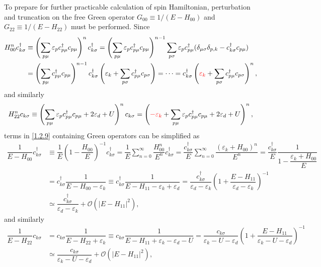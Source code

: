 \documentclass[aps,prx,superscriptaddress,onecolumn,preprintnumbers,nofootinbib,longbibliography]{revtex4-1}
\begin{document}
		\indent To prepare for further practicable calculation of spin Hamiltonian, perturbation and truncation on the free Green operator $G_{00}\equiv1/(E-H_{00})$ and $G_{22}\equiv1/(E-H_{22})$ must be performed. Since
		\begin{align*}
			H_{00}^nc_{k \sigma}^\dagger&\equiv\left(\sum_{p\mu}\varepsilon_p c_{p \mu}^\dagger c_{p\mu}\right)^n c_{k \sigma}^\dagger=\left(\sum_{p\mu}\varepsilon_p c_{p \mu}^\dagger c_{p\mu}\right)^{n-1}\sum_{p \sigma}\varepsilon_p c_{p\mu}^\dagger(\delta_{\mu\sigma}\delta_{p,k}-c_{k \sigma}^\dagger c_{p\mu})\\
			&=\left(\sum_{p\mu}c_{p \mu}^\dagger c_{p\mu}\right)^{n-1}c_{k\sigma}^\dagger\left(\varepsilon_k+\sum_{p \sigma}c_{p\mu}^\dagger c_{p\sigma}\right)=\cdots=c_{k\sigma}^\dagger\left({\color{red}\varepsilon_k}+\sum_{p \sigma}c_{p\mu}^\dagger c_{p\sigma}\right)^n,
		\end{align*}
		and similarly
		\begin{equation*}
			H_{22}^n c_{k \sigma}\equiv\left(\sum_{p\mu}\varepsilon_p c_{p\mu}^\dagger c_{p\mu}+2\varepsilon_d+U\right)^nc_{k\sigma}=\left({\color{red}-\varepsilon_k}+\sum_{p\mu}\varepsilon_p c_{p\mu}^\dagger c_{p\mu}+2 \varepsilon_d+U\right)^n,
		\end{equation*}
		terms in \eqref{1.2.9} containing Green operators can be simplified as
		\begin{align*}
			\dfrac{1}{E-H_{00}}c_{k\sigma}^\dagger&\equiv\dfrac{1}{E}\left(1-\dfrac{H_{00}}{E}\right)^{-1}c_{k\sigma}^\dagger=\dfrac{1}{E}\sum_{n=0}^\infty\dfrac{H_{00}^n}{E^n}c_{k\sigma}^\dagger=\dfrac{c_{k\sigma}^\dagger}{E}\sum_{n=0}^\infty\dfrac{(\varepsilon_k+H_{00})^n}{E^n}=\dfrac{c_{k\sigma}^\dagger}{E}\dfrac{1}{1-\dfrac{\varepsilon_k+H_{00}}{E}}\\
			&=c_{k \sigma}^\dagger\dfrac{1}{E-H_{00}-\varepsilon_k}\equiv c_{k \sigma}^\dagger\dfrac{1}{E-H_{11}-\varepsilon_k+\varepsilon_d}=\dfrac{c_{k \sigma}^\dagger}{\varepsilon_d- \varepsilon_k}\left(1+\dfrac{E-H_{11}}{\varepsilon_d- \varepsilon_k}\right)^{-1}\\
			&\simeq\dfrac{c_{k \sigma}^\dagger}{\varepsilon_d- \varepsilon_k}+\mathcal{O}(|E-H_{11}|^2),
		\end{align*}
		and similarly
		\begin{align*}
			\dfrac{1}{E-H_{22}}c_{k\sigma}&=c_{k \sigma}\dfrac{1}{E-H_{22}+\varepsilon_k}\equiv c_{k \sigma}\dfrac{1}{E-H_{11}+\varepsilon_k-\varepsilon_d-U}=\dfrac{c_{k \sigma}}{\varepsilon_k-U- \varepsilon_d}\left(1+\dfrac{E-H_{11}}{\varepsilon_k-U- \varepsilon_d}\right)^{-1}\\
			&\simeq\dfrac{c_{k \sigma}}{\varepsilon_k-U- \varepsilon_d}+\mathcal{O}(|E-H_{11}|^2),
		\end{align*}
\end{document}
